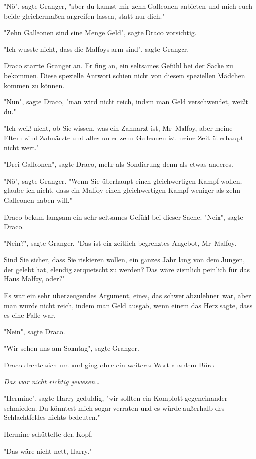 {"Nö", sagte Granger, "aber du kannst mir zehn Galleonen anbieten und mich euch beide gleichermaßen angreifen lassen, statt nur dich."

"Zehn Galleonen sind eine Menge Geld", sagte Draco vorsichtig.

"Ich wusste nicht, dass die Malfoys arm sind", sagte Granger.

Draco starrte Granger an. Er fing an, ein seltsames Gefühl bei der Sache zu bekommen. Diese spezielle Antwort schien nicht von diesem speziellen Mädchen kommen zu können.

"Nun", sagte Draco, "man wird nicht reich, indem man Geld verschwendet, weißt du."

"Ich weiß nicht, ob Sie wissen, was ein Zahnarzt ist, Mr~Malfoy, aber meine Eltern sind Zahnärzte und alles unter zehn Galleonen ist meine Zeit überhaupt nicht wert."

"Drei Galleonen", sagte Draco, mehr als Sondierung denn als etwas anderes.

"Nö", sagte Granger. "Wenn Sie überhaupt einen gleichwertigen Kampf wollen, glaube ich nicht, dass ein Malfoy einen gleichwertigen Kampf weniger als zehn Galleonen haben will."

Draco bekam langsam ein sehr seltsames Gefühl bei dieser Sache. "Nein", sagte Draco.

"Nein?", sagte Granger. "Das ist ein zeitlich begrenztes Angebot, Mr~Malfoy.

Sind Sie sicher, dass Sie riskieren wollen, ein ganzes Jahr lang von dem Jungen, der gelebt hat, elendig zerquetscht zu werden? Das wäre ziemlich peinlich für das Haus Malfoy, oder?"

Es war ein sehr überzeugendes Argument, eines, das schwer abzulehnen war, aber man wurde nicht reich, indem man Geld ausgab, wenn einem das Herz sagte, dass es eine Falle war.

"Nein", sagte Draco.

"Wir sehen uns am Sonntag", sagte Granger.

Draco drehte sich um und ging ohne ein weiteres Wort aus dem Büro.

\emph{Das war nicht richtig gewesen…}

"Hermine", sagte Harry geduldig, "wir sollten ein Komplott gegeneinander schmieden. Du könntest mich sogar verraten und es würde außerhalb des Schlachtfeldes nichts bedeuten."

Hermine schüttelte den Kopf.

"Das wäre nicht nett, Harry."

}
